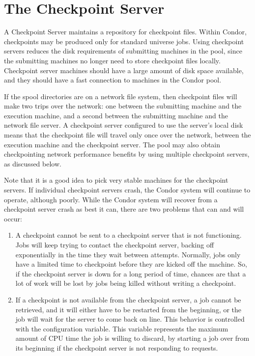 \section{\label{sec:Ckpt-Server} The Checkpoint Server}

A Checkpoint Server maintains a repository for checkpoint files.
Within Condor, checkpoints may be produced only for standard universe jobs.
Using checkpoint servers reduces the disk requirements of submitting
machines in the pool, since the submitting machines no longer need to
store checkpoint files locally.
Checkpoint server machines should have a large amount of disk space
available, and they should have a fast connection to machines
in the Condor pool.

If the spool directories are on a network file system, then
checkpoint files will make two trips over the network: one between the
submitting machine and the execution machine, and a second between the
submitting machine and the network file server.
A checkpoint server configured to use the server's local disk
means that the checkpoint file will travel only once over the
network, between the execution machine and the checkpoint server.
The pool may also obtain checkpointing network performance benefits by
using multiple checkpoint servers, as discussed below.

Note that it is a good idea to pick very stable machines for the checkpoint
servers.
If individual checkpoint servers crash, the Condor system will continue to
operate, although poorly.  
While the Condor system will recover from a checkpoint server crash
as best it can, there are two problems that can and will occur:
\begin{enumerate}

\item A checkpoint cannot be sent to a checkpoint server that
is not functioning.
Jobs will keep trying to contact the checkpoint server, backing
off exponentially in the time they wait between attempts.
Normally, jobs only have a limited time to checkpoint before they are
kicked off the machine.
So, if the checkpoint server is down for a long period of time,
chances are that a lot of work will be lost by jobs being killed 
without writing a checkpoint. 

\item If a checkpoint is not available from the checkpoint server,
a job cannot be retrieved, and it will either have to be restarted from
the beginning, or the job will wait for the server to come back on line.
This behavior is controlled with the
 configuration variable.
This variable represents the maximum amount of CPU time the job is
willing to discard, by starting a job over from its beginning if the
checkpoint server is not responding to requests.

\end{enumerate}

